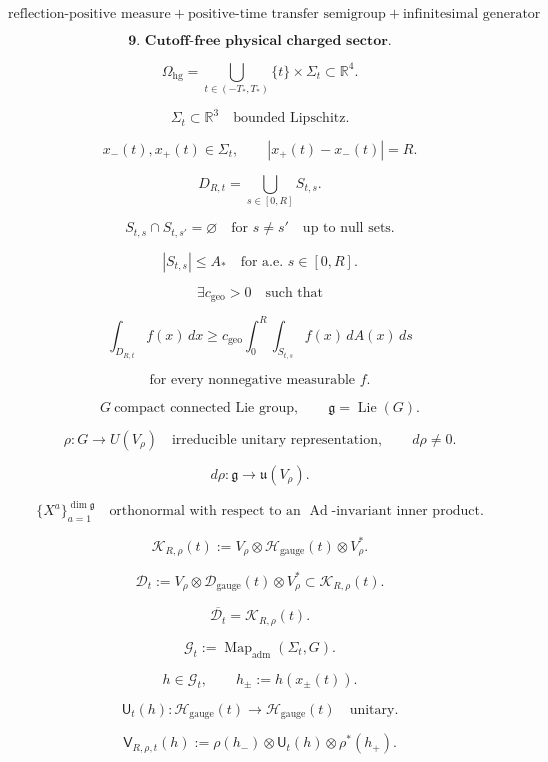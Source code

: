 \documentclass[11pt]{article}
\begin{document}
\[
\boxed{
\text{reflection-positive measure}
+
\text{positive-time transfer semigroup}
+
\text{infinitesimal generator}
}
\]

\bigskip

\[
\textbf{9. Cutoff-free physical charged sector.}
\]

\[
\Omega_{\mathrm{hg}}
=
\bigcup_{t\in(-T_\ast,T_\ast)}
\{t\}\times\Sigma_t
\subset\mathbb R^4.
\]

\[
\Sigma_t\subset\mathbb R^3
\quad
\text{bounded Lipschitz}.
\]

\[
x_-(t),x_+(t)\in\Sigma_t,
\qquad
|x_+(t)-x_-(t)|=R.
\]

\[
D_{R,t}
=
\bigcup_{s\in[0,R]}S_{t,s}.
\]

\[
S_{t,s}\cap S_{t,s'}=\varnothing
\quad
\text{for }s\neq s'
\quad
\text{up to null sets}.
\]

\[
|S_{t,s}|\le A_\ast
\quad
\text{for a.e. }s\in[0,R].
\]

\[
\exists c_{\mathrm{geo}}>0
\quad
\text{such that}
\]

\[
\int_{D_{R,t}} f(x)\,dx
\ge
c_{\mathrm{geo}}
\int_0^R
\int_{S_{t,s}} f(x)\,dA(x)\,ds
\]

\[
\text{for every nonnegative measurable }f.
\]

\[
G\ \text{compact connected Lie group},
\qquad
\mathfrak g=\operatorname{Lie}(G).
\]

\[
\rho:G\to U(V_\rho)
\quad
\text{irreducible unitary representation},
\qquad
d\rho\neq0.
\]

\[
d\rho:\mathfrak g\to\mathfrak u(V_\rho).
\]

\[
\{X^a\}_{a=1}^{\dim\mathfrak g}
\quad
\text{orthonormal with respect to an }\operatorname{Ad}\text{-invariant inner product}.
\]

\[
\mathcal K_{R,\rho}(t)
:=
V_\rho\otimes\mathcal H_{\mathrm{gauge}}(t)\otimes V_\rho^\ast.
\]

\[
\mathscr D_t
:=
V_\rho\otimes\mathscr D_{\mathrm{gauge}}(t)\otimes V_\rho^\ast
\subset
\mathcal K_{R,\rho}(t).
\]

\[
\overline{\mathscr D_t}
=
\mathcal K_{R,\rho}(t).
\]

\[
\mathcal G_t
:=
\operatorname{Map}_{\mathrm{adm}}(\Sigma_t,G).
\]

\[
h\in\mathcal G_t,
\qquad
h_\pm:=h(x_\pm(t)).
\]

\[
\mathsf U_t(h):
\mathcal H_{\mathrm{gauge}}(t)\to\mathcal H_{\mathrm{gauge}}(t)
\quad
\text{unitary}.
\]

\[
\mathsf V_{R,\rho,t}(h)
:=
\rho(h_-)\otimes \mathsf U_t(h)\otimes \rho^\ast(h_+).
\]
\end{document}
